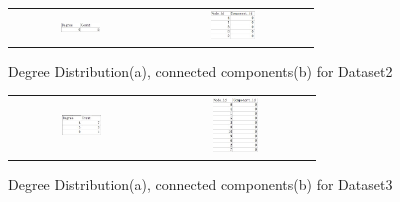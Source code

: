 \begin{figure}[H]
\begin{center}
\begin{tabular}{cc}
     \includegraphics[width=0.3\textwidth]{FIG/2dd.jpg} &
     \includegraphics[width=0.3\textwidth]{FIG/2cc.jpg} \\
\end{tabular}
\caption{Degree Distribution(a), connected components(b) for Dataset2}
\end{center}
\end{figure}

\begin{figure}[H]
\begin{center}
\begin{tabular}{cc}
     \includegraphics[width=0.3\textwidth]{FIG/3dd.jpg} &
     \includegraphics[width=0.3\textwidth]{FIG/3cc.jpg} \\
\end{tabular}
\caption{Degree Distribution(a), connected components(b) for Dataset3}
\end{center}
\end{figure}

